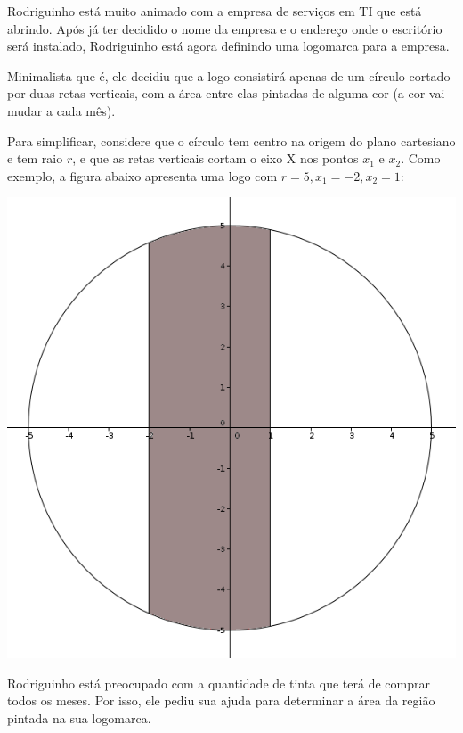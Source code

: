 \vspace{-0.4cm}
Rodriguinho está muito animado com a empresa de serviços em TI que está abrindo.
Após já ter decidido o nome da empresa e o endereço onde o escritório será
instalado, Rodriguinho está agora definindo uma logomarca para a empresa.

Minimalista que é, ele decidiu que a logo consistirá apenas de um círculo
cortado por duas retas verticais, com a área entre elas pintadas de alguma cor
(a cor vai mudar a cada mês).

Para simplificar, considere que o círculo tem centro na origem do plano
cartesiano e tem raio $r$, e que as retas verticais cortam o eixo X nos
pontos $x_1$ e $x_2$. Como exemplo, a figura abaixo apresenta
uma logo com $r=5, x_1=-2, x_2=1$:

\vspace{-0.5cm}
\begin{center}
    \includegraphics[scale=0.3]{logomarca/logo1.png}
\end{center}

\vspace{-0.5cm}
Rodriguinho está preocupado com a quantidade de tinta que terá de comprar todos
os meses. Por isso, ele pediu sua ajuda para
determinar a área da região pintada na sua logomarca.


